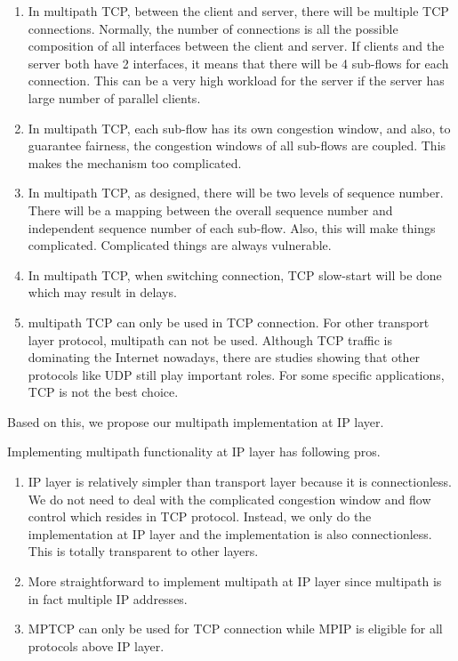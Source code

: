 \begin{enumerate}
\item In multipath TCP, between the client and server, there will be multiple TCP connections. Normally, the number of connections is all the possible composition of all interfaces between the client and server. If clients and the server both have 2 interfaces, it means that there will be 4 sub-flows for each connection. This can be a very high workload for the server if the server has large number of parallel clients.

\item In multipath TCP, each sub-flow has its own congestion window, and also, to guarantee 
fairness, the congestion windows of all sub-flows are coupled. This makes the mechanism too complicated.

\item In multipath TCP, as designed, there will be two levels of sequence number. There will be a mapping between the overall sequence number and independent sequence number of each sub-flow. Also, this will make things complicated. Complicated things are always vulnerable.

\item In multipath TCP, when switching connection, TCP slow-start will be done which may result in delays.

\item multipath TCP can only be used in TCP connection. For other transport layer protocol, multipath can not be used. Although TCP traffic is dominating the Internet nowadays, there are studies showing that other protocols like UDP still play important roles. For some specific applications, TCP is not the best choice. 
\end{enumerate}

Based on this, we propose our multipath implementation at IP layer.

Implementing multipath functionality at IP layer has following pros.
\begin{enumerate}
\item IP layer is relatively simpler than transport layer because it is connectionless. We do not need to deal with the complicated congestion window and flow control which resides in TCP protocol. Instead, we only do the implementation at IP layer and the implementation is also connectionless. This is totally transparent to other layers. 

\item More straightforward to implement multipath at IP layer since multipath is in fact multiple IP addresses.

\item MPTCP can only be used for TCP connection while MPIP is eligible for all protocols above IP layer.
\end{enumerate}

